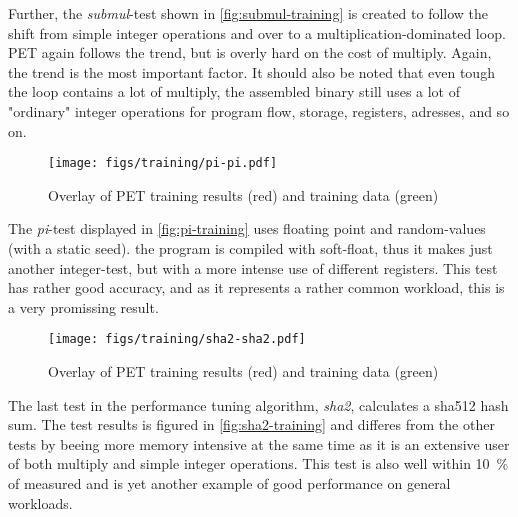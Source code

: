 Further, the \emph{submul}-test shown in \autoref{fig:submul-training} is
created to follow the shift from simple integer operations and over to
a multiplication-dominated loop. PET again follows the trend, but is
overly hard on the cost of multiply. Again, the trend is the most important
factor. It should also be noted that even tough the loop contains a lot of
multiply, the assembled binary still uses a lot of "ordinary" integer
operations for program flow, storage, registers, adresses, and so on.

\begin{figure}[htb]
    \centering
    \texttt{[image: figs/training/pi-pi.pdf]}
    \caption{Overlay of PET training results (red) and training data (green)}
    \label{fig:pi-training}
\end{figure}

The \emph{pi}-test displayed in \autoref{fig:pi-training} uses floating point
and random-values (with a static seed).  the program is compiled with
soft-float, thus it makes just another integer-test, but with a more intense use
of different registers. This test has rather good accuracy, and as it represents
a rather common workload, this is a very promissing result.

\begin{figure}[htb]
    \centering
    \texttt{[image: figs/training/sha2-sha2.pdf]}
    \caption{Overlay of PET training results (red) and training data (green)}
    \label{fig:sha2-training}
\end{figure}

The last test in the performance tuning algorithm, \emph{sha2}, calculates a
sha512 hash sum.  The test results is figured in \autoref{fig:sha2-training} and
differes from the other tests by beeing more memory intensive at the same time
as it is an extensive user of both multiply and simple integer operations. This
test is also well within 10~\% of measured and is yet another example of good
performance on general workloads.

